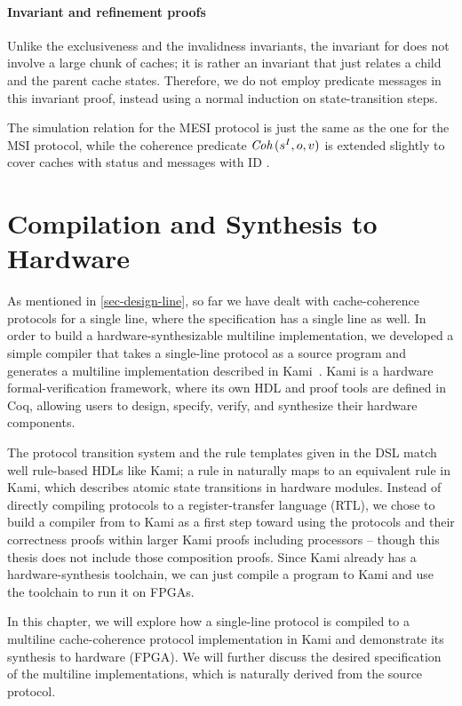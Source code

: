 \subsubsection{Invariant and refinement proofs}

Unlike the exclusiveness and the invalidness invariants, the invariant for \stE{} does not involve a large chunk of caches; it is rather an invariant that just relates a child and the parent cache states.
Therefore, we do not employ predicate messages in this invariant proof, instead using a normal induction on state-transition steps.

The simulation relation for the MESI protocol is just the same as the one for the MSI protocol, while the coherence predicate $\textit{Coh}\,(s^I, o, v)$ is extended slightly to cover caches with \stE{} status and messages with ID .

\chapter{Compilation and Synthesis to Hardware}
\label{sec-comp-syn}

As mentioned in \autoref{sec-design-line}, so far we have dealt with cache-coherence protocols for a single line, where the specification has a single line as well.
In order to build a hardware-synthesizable multiline implementation, we developed a simple compiler that takes a single-line \hemiola{} protocol as a source program and generates a multiline implementation described in Kami~\cite{kami}.
Kami is a hardware formal-verification framework, where its own HDL and proof tools are defined in Coq, allowing users to design, specify, verify, and synthesize their hardware components.

The protocol transition system and the rule templates given in the \hemiola{} DSL match well rule-based HDLs like Kami; a rule in \hemiola{} naturally maps to an equivalent rule in Kami, which describes atomic state transitions in hardware modules.
Instead of directly compiling \hemiola{} protocols to a register-transfer language (RTL), we chose to build a compiler from \hemiola{} to Kami as a first step toward using the protocols and their correctness proofs within larger Kami proofs including processors -- though this thesis does not include those composition proofs.
Since Kami already has a hardware-synthesis toolchain, we can just compile a \hemiola{} program to Kami and use the toolchain to run it on FPGAs.

In this chapter, we will explore how a single-line \hemiola{} protocol is compiled to a multiline cache-coherence protocol implementation in Kami and demonstrate its synthesis to hardware (FPGA).
We will further discuss the desired specification of the multiline implementations, which is naturally derived from the source \hemiola{} protocol.

